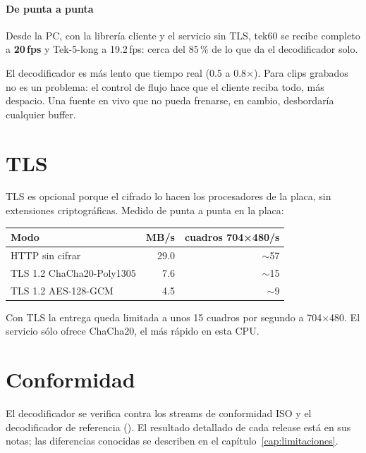 \paragraph{De punta a punta} Desde la PC, con la librería cliente y el
servicio  sin TLS, tek60 se recibe completo a
\textbf{20\,fps} y Tek-5-long a 19.2\,fps: cerca del 85\,\% de lo que da el
decodificador solo.

\begin{nota}
El decodificador es más lento que tiempo real (0.5 a 0.8×). Para clips
grabados no es un problema: el control de flujo hace que el cliente reciba
todo, más despacio. Una fuente en vivo que no pueda frenarse, en cambio,
desbordaría cualquier buffer.
\end{nota}

\section{TLS}

TLS es opcional porque el cifrado lo hacen los procesadores de la placa, sin
extensiones criptográficas. Medido de punta a punta en la placa:

\begin{center}
\begin{tabular}{@{}l r r@{}}
\toprule
\textbf{Modo} & \textbf{MB/s} & \textbf{cuadros 704×480/s} \\
\midrule
HTTP sin cifrar            & 29.0 & $\sim$57 \\
TLS 1.2 ChaCha20-Poly1305  &  7.6 & $\sim$15 \\
TLS 1.2 AES-128-GCM        &  4.5 & $\sim$9 \\
\bottomrule
\end{tabular}
\end{center}

Con TLS la entrega queda limitada a unos 15 cuadros por segundo a 704×480. El
servicio sólo ofrece ChaCha20, el más rápido en esta CPU.

\section{Conformidad}

El decodificador se verifica contra los streams de conformidad ISO y el
decodificador de referencia (). El resultado detallado de
cada release está en sus notas; las diferencias conocidas se describen en el
capítulo~\ref{cap:limitaciones}.
